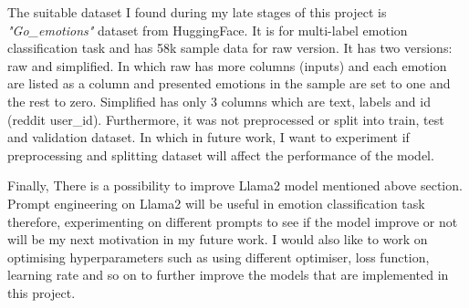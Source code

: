 The suitable dataset I found during my late stages of this project is \textit{"Go\_emotions"} dataset from HuggingFace\cite{Demszky_Movshovitz-Attias_Ko_Cowen_Nemade_Ravi_2020}. It is for multi-label emotion classification task and has 58k sample data for raw version. It has two versions: raw and simplified. In which raw has more columns (inputs) and each emotion are listed as a column and presented emotions in the sample are set to one and the rest to zero. Simplified has only 3 columns which are text, labels and id (reddit user\_id). Furthermore, it was not preprocessed or split into train, test and validation dataset. In which in future work, I want to experiment if preprocessing and splitting dataset will affect the performance of the model.

Finally, There is a possibility to improve Llama2 model mentioned above section. Prompt engineering on Llama2 will be useful in emotion classification task therefore, experimenting on different prompts to see if the model improve or not will be my next motivation in my future work. I would also like to work on optimising hyperparameters such as using different optimiser, loss function, learning rate and so on to further improve the models that are implemented in this project.